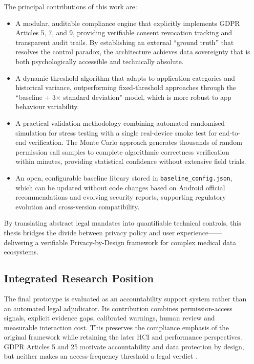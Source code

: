 The principal contributions of this work are:

\begin{itemize}
\item A modular, auditable compliance engine that explicitly implements GDPR Articles 5, 7, and 9, providing verifiable consent revocation tracking and transparent audit trails. By establishing an external ``ground truth'' that resolves the control paradox, the architecture achieves data sovereignty that is both psychologically accessible and technically absolute.
\item A dynamic threshold algorithm that adapts to application categories and historical variance, outperforming fixed-threshold approaches through the ``baseline + 3× standard deviation'' model, which is more robust to app behaviour variability.
\item A practical validation methodology combining automated randomised simulation for stress testing with a single real-device smoke test for end-to-end verification. The Monte Carlo approach generates thousands of random permission call samples to complete algorithmic correctness verification within minutes, providing statistical confidence without extensive field trials.
\item An open, configurable baseline library stored in \texttt{baseline\_config.json}, which can be updated without code changes based on Android official recommendations and evolving security reports, supporting regulatory evolution and cross-version compatibility.
\end{itemize}

By translating abstract legal mandates into quantifiable technical controls, this thesis bridges the divide between privacy policy and user experience——delivering a verifiable Privacy-by-Design framework for complex medical data ecosystems.

\subsection{Integrated Research Position}

The final prototype is evaluated as an accountability support system rather than an automated legal adjudicator. Its contribution combines permission-access signals, explicit evidence gaps, calibrated warnings, human review and measurable interaction cost. This preserves the compliance emphasis of the original framework while retaining the later HCI and performance perspectives. GDPR Articles 5 and 25 motivate accountability and data protection by design, but neither makes an access-frequency threshold a legal verdict \cite{eurlex2016,edpb2019}.

